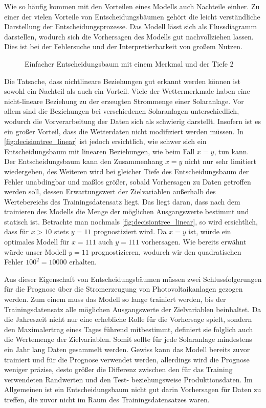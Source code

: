 \documentclass[12pt, a4paper]{article}
\begin{document}

Wie so häufig kommen mit den Vorteilen eines Modells auch Nachteile einher. Zu einer der vielen Vorteile von Entscheidungsbäumen gehört die leicht verständliche Darstellung der Entscheidungsprozesse. Das Modell lässt sich als Flussdiagramm darstellen, wodurch sich die Vorhersagen des Modells gut nachvollziehen lassen. Dies ist bei der Fehlersuche und der Interpretierbarkeit von großem Nutzen.

\begin{figure}
\centering
\def\svgwidth{350pt}

\caption{Einfacher Entscheidungsbaum mit einem Merkmal und der Tiefe 2}
\label{fig:decisiontree_linear}
\end {figure}

Die Tatsache, dass nichtlineare Beziehungen gut erkannt werden können ist sowohl ein Nachteil als auch ein Vorteil. Viele der Wettermerkmale haben eine nicht-lineare Beziehung zu der erzeugten Strommenge einer Solaranlage. Vor allem sind die Beziehungen bei verschiedenen Solaranlagen unterschiedlich, wodurch die Vorverarbeitung der Daten sich als schwierig darstellt. Insofern ist es ein großer Vorteil, dass die Wetterdaten nicht modifiziert werden müssen. In \autoref{fig:decisiontree_linear} ist jedoch ersichtlich, wie schwer sich ein Entscheidungsbaum mit linearen Beziehungen, wie beim Fall $x=y$, tun kann. Der Entscheidungsbaum kann den Zusammenhang $x=y$ nicht nur sehr limitiert wiedergeben, des Weiteren wird bei gleicher Tiefe des Entscheidungsbaum der Fehler  unabdingbar und maßlos größer, sobald Vorhersagen zu Daten getroffen werden soll, dessen Erwartungswert der Zielvariablen außerhalb des Wertebereichs des Trainingsdatensatz liegt. Das liegt daran, dass nach dem trainieren des Modells die Menge der möglichen Ausgangswerte bestimmt und statisch ist. Betrachte man nochmals \autoref{fig:decisiontree_linear}, so wird ersichtlich, dass für $x>10$ stets $y=11$ prognostiziert wird. Da $x=y$ ist, würde ein optimales Modell für $x=111$ auch $y=111$ vorhersagen. Wie bereits erwähnt würde unser Modell $y=11$ prognostizieren, wodurch wir den quadratischen Fehler $100^{2}=10000$ erhalten. 

Aus dieser Eigenschaft von Entscheidungsbäumen müssen zwei Schlussfolgerungen für die Prognose über die Stromerzeugung von Photovoltaikanlagen gezogen werden. Zum einem muss das Modell so lange trainiert werden, bis der Trainingsdatensatz alle möglichen Ausgangswerte der Zielvariablen beinhaltet. Da die Jahreszeit nicht nur eine erhebliche Rolle für die Vorhersage spielt, sondern den Maximalertrag eines Tages führend mitbestimmt, definiert sie folglich auch die Wertemenge der Zielvariablen. Somit sollte für jede Solaranlage mindestens ein Jahr lang Daten gesammelt werden. Gewiss kann das Modell bereits zuvor trainiert und für die Prognose verwendet werden, allerdings wird die Prognose weniger präzise, desto größer die Differenz zwischen den für das Training verwendeten Randwerten und den Test- beziehungsweise Produktionsdaten. Im Allgemeinen ist ein Entscheidungsbaum nicht gut darin Vorhersagen für Daten zu treffen, die zuvor nicht im Raum des Trainingsdatensatzes waren.
\end{document}
